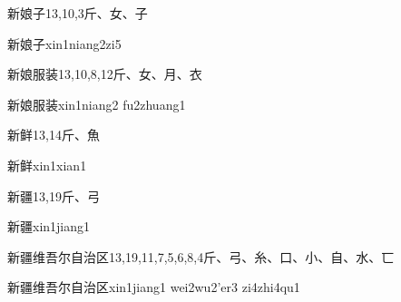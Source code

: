 \begin{entry}{新娘子}{13,10,3}{⽄、⼥、⼦}
  \begin{phonetics}{新娘子}{xin1niang2zi5}
  \end{phonetics}
\end{entry}

\begin{entry}{新娘服装}{13,10,8,12}{⽄、⼥、⽉、⾐}
  \begin{phonetics}{新娘服装}{xin1niang2 fu2zhuang1}
  \end{phonetics}
\end{entry}

\begin{entry}{新鲜}{13,14}{⽄、⿂}
  \begin{phonetics}{新鲜}{xin1xian1}
  \end{phonetics}
\end{entry}

\begin{entry}{新疆}{13,19}{⽄、⼸}
  \begin{phonetics}{新疆}{xin1jiang1}
  \end{phonetics}
\end{entry}

\begin{entry}{新疆维吾尔自治区}{13,19,11,7,5,6,8,4}{⽄、⼸、⽷、⼝、⼩、⾃、⽔、⼖}
  \begin{phonetics}{新疆维吾尔自治区}{xin1jiang1 wei2wu2'er3 zi4zhi4qu1}
  \end{phonetics}
\end{entry}



